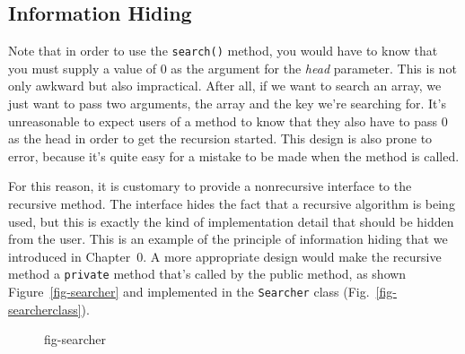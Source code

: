 
\subsection{Information Hiding}
\noindent Note that in order to use the {\tt search()} method, you would have to
know that you must supply a value of 0 as the argument for the {\it
head} parameter.  This is not only awkward but also impractical.
After all, if we want to search an array, we just want to pass two
arguments, the array and the key we're searching for.  It's
unreasonable to expect users of a method to know that they also have
to pass 0 as the head in order to get the recursion started.  This
design is also prone to error, because it's quite easy for a mistake
to be made when the method is called.

For this reason, it is customary to provide a nonrecursive interface
to the recursive method.  The interface hides the fact that a
recursive algorithm is being used, but this is exactly the kind of
implementation detail that should be hidden from the user. This is an
example of the principle of information hiding that we introduced in
Chapter~0. A more
appropriate design would make the recursive method a {\tt private}
method that's called by the public method, as shown
Figure~\ref{fig-searcher} and implemented in the {\tt Searcher} class
(Fig.~\ref{fig-searcherclass}).

\begin{figure}[htb]
 {fig-searcher}

\end{figure}

